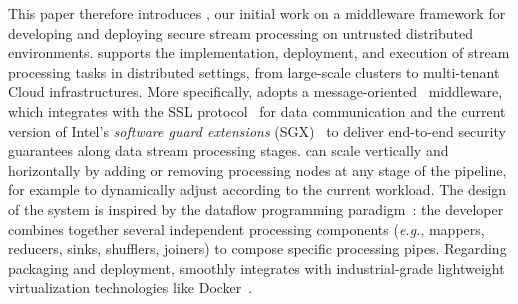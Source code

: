 This paper therefore introduces \SYS{}, our initial work on a middleware framework for developing and deploying secure stream processing on untrusted distributed environments.
\SYS{} supports the implementation, deployment, and execution of stream processing tasks in distributed settings, from large-scale clusters to multi-tenant Cloud infrastructures.
More specifically, \SYS{} adopts a message-oriented~\cite{mom} middleware, which integrates with the SSL protocol~\cite{freier2011secure} for data communication and the current version of Intel's \emph{software guard extensions} (SGX)~\cite{costan_intel} to deliver end-to-end security guarantees along data stream processing stages.
\SYS{} can scale vertically and horizontally by adding or removing processing nodes at any stage of the pipeline, for example to dynamically adjust according to the current workload.
% 
% 
The design of the \SYS{} system is inspired by the dataflow programming paradigm~\cite{uustalu_essence_2005}: the developer combines together several independent processing components (\emph{e.g.}, mappers, reducers, sinks, shufflers, joiners) to compose specific processing pipes.
Regarding packaging and deployment, \SYS{} smoothly integrates with industrial-grade lightweight virtualization technologies like Docker~\cite{docker}.



